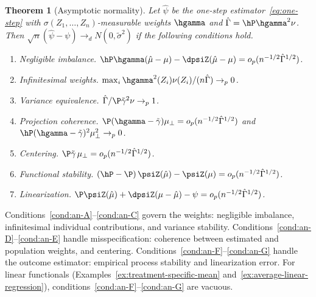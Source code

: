\documentclass{article}
\newtheorem{theorem}{Theorem}[section]
\begin{document}
\begin{theorem}[Asymptotic normality]
\label{thm:asymptotic-normality}
Let $\hat\psi$ be the one-step estimator~\eqref{eq:one-step}
with $\sigma(Z_1, \ldots, Z_n)$-measurable weights $\hgamma$
and $\hat\Gamma = \hP\hgamma^2\nu$.
Then
$\sqrt{n}(\hat\psi - \psi) \to_d N(0, \tilde\sigma^2)$
if the following conditions hold.
\begin{enumerate}[label=\textup{(\Alph*)}]
\item\label{cond:an-A}
\textit{Negligible imbalance.}
$\hP\hgamma(\hat\mu - \mu)
  - \dpsiZ(\hat\mu - \mu)
  = o_p(n^{-1/2}\hat\Gamma^{1/2})$.

\item\label{cond:an-B}
\textit{Infinitesimal weights.}
$\max_i \hgamma^2(Z_i)\nu(Z_i) / (n\hat\Gamma) \to_p 0$.

\item\label{cond:an-C}
\textit{Variance equivalence.}
$\hat\Gamma / \P\tilde\gamma^2\nu \to_p 1$.

\item\label{cond:an-D}
\textit{Projection coherence.}
$\P(\hgamma - \tilde\gamma)\mu_\perp
  = o_p(n^{-1/2}\hat\Gamma^{1/2})$
and
$\hP(\hgamma - \tilde\gamma)^2 \mu_\perp^2 \to_p 0$.

\item\label{cond:an-E}
\textit{Centering.}
$\P\tilde\gamma\, \mu_\perp
  = o_p(n^{-1/2}\hat\Gamma^{1/2})$.

\item\label{cond:an-F}
\textit{Functional stability.}
$(\hP - \P)\,\psiZ(\hat\mu) - \psiZ(\mu)
= o_p(n^{-1/2}\hat\Gamma^{1/2})$.

\item\label{cond:an-G}
\textit{Linearization.}
$\P\psiZ(\hat\mu) + \dpsiZ(\mu - \hat\mu) - \psi
  = o_p(n^{-1/2}\hat\Gamma^{1/2})$.
\end{enumerate}
\end{theorem}

Conditions~\ref{cond:an-A}--\ref{cond:an-C}
govern the weights:
negligible imbalance,
infinitesimal individual contributions,
and variance stability.
Conditions~\ref{cond:an-D}--\ref{cond:an-E}
handle misspecification:
coherence between estimated and population weights,
and centering.
Conditions~\ref{cond:an-F}--\ref{cond:an-G}
handle the outcome estimator:
empirical process stability
and linearization error.
For linear functionals
(Examples~\ref{ex:treatment-specific-mean}
and~\ref{ex:average-linear-regression}),
conditions~\ref{cond:an-F}--\ref{cond:an-G} are vacuous.
\end{document}
